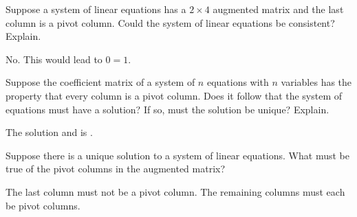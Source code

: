 \documentclass{ximera}
\begin{document}
\begin{problem}\label{prb:2.40} Suppose a system of linear equations has a $2\times 4$ augmented
matrix and the last column is a pivot column. Could the system of linear
equations be consistent? Explain.
\begin{hint}
 No. This would lead to $0=1.$
\end{hint}
\end{problem}

\begin{problem}\label{prb:2.41} Suppose the coefficient matrix of a system of $n$ equations with $n$
variables has the property that every column is a pivot column. Does it
follow that the system of equations must have a solution? If so, must the
solution be unique? Explain.

The solution  and is .
\end{problem}

\begin{problem}\label{prb:2.42} Suppose there is a unique solution to a system of linear equations.
What must be true of the pivot columns in the augmented matrix?
\begin{hint}
The last column must not be a pivot column. The remaining columns must each be pivot
columns.
\end{hint}
\end{problem}
\end{document}
